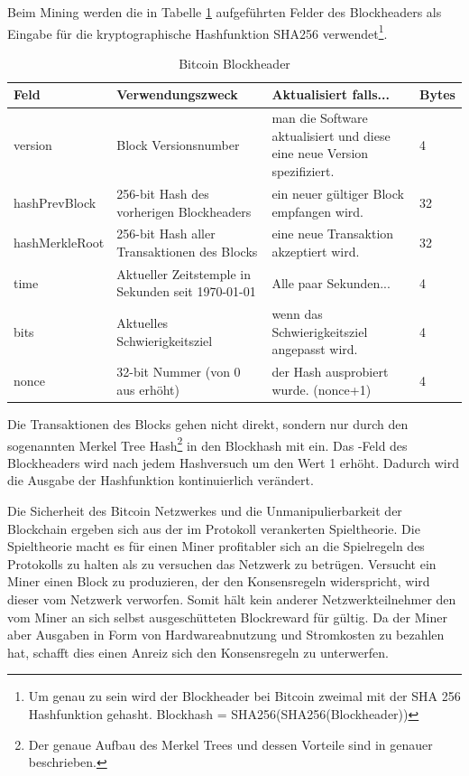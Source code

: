 Beim Mining werden die in Tabelle \ref{tab:btc_block_header} aufgeführten Felder des Blockheaders als Eingabe für die kryptographische Hashfunktion SHA256 verwendet\footnote{Um genau zu sein wird der Blockheader bei Bitcoin zweimal mit der SHA 256 Hashfunktion gehasht. Blockhash = SHA256(SHA256(Blockheader))}.
\begin{table}[H]
\centering
\caption{Bitcoin Blockheader}
\label{tab:btc_block_header}
\begin{tabular}{|l|p{}|p{}|l|}
\hline
\textbf{Feld}  & \textbf{Verwendungszweck}                         & \textbf{Aktualisiert falls...}                                          & \textbf{Bytes} \\ \hline
version        & Block Versionsnumber                             & man die Software aktualisiert und diese eine neue Version spezifiziert. & 4              \\ \hline
hashPrevBlock  & 256-bit Hash des vorherigen Blockheaders          & ein neuer gültiger Block empfangen wird.                                & 32             \\ \hline
hashMerkleRoot & 256-bit Hash aller Transaktionen des Blocks       & eine neue Transaktion akzeptiert wird.                                  & 32             \\ \hline
time           & Aktueller Zeitstemple in Sekunden seit 1970-01-01 & Alle paar Sekunden...                                                   & 4              \\ \hline
bits           & Aktuelles Schwierigkeitsziel                      & wenn das Schwierigkeitsziel angepasst wird.                             & 4              \\ \hline
nonce          & 32-bit Nummer (von 0 aus erhöht)                  & der Hash ausprobiert wurde. (nonce+1)                                   & 4              \\ \hline
\end{tabular}
\end{table}
Die Transaktionen des Blocks gehen nicht direkt, sondern nur durch den sogenannten Merkel Tree Hash\footnote{Der genaue Aufbau des Merkel Trees und dessen Vorteile sind in \cite{bitcoin_white_paper} genauer beschrieben.} in den Blockhash mit ein. Das -Feld des Blockheaders wird nach jedem Hashversuch um den Wert 1 erhöht. Dadurch wird die Ausgabe der Hashfunktion kontinuierlich verändert.

Die Sicherheit des Bitcoin Netzwerkes und die Unmanipulierbarkeit der Blockchain ergeben sich aus der im Protokoll verankerten Spieltheorie. Die Spieltheorie macht es für einen Miner profitabler sich an die Spielregeln des Protokolls zu halten als zu versuchen das Netzwerk zu betrügen. Versucht ein Miner einen Block zu produzieren, der den Konsensregeln widerspricht, wird dieser vom Netzwerk verworfen. Somit hält kein anderer Netzwerkteilnehmer den vom Miner an sich selbst ausgeschütteten Blockreward für gültig. Da der Miner aber Ausgaben in Form von Hardwareabnutzung und Stromkosten zu bezahlen hat, schafft dies einen Anreiz sich den Konsensregeln zu unterwerfen.